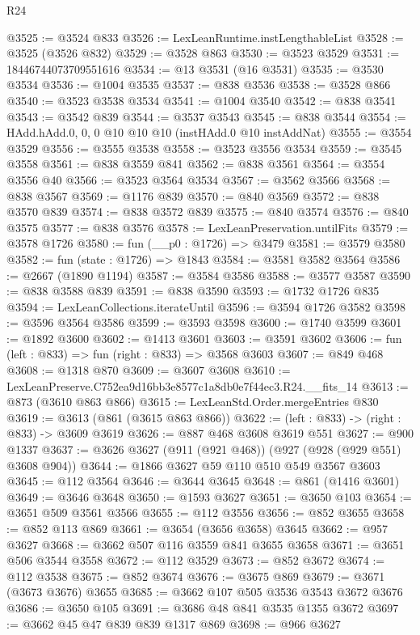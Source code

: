 \begin{lexlean}{R24}
\begin{coremodule}
@3525 := @3524 @833
@3526 := LexLeanRuntime.instLengthableList
@3528 := @3525 (@3526 @832)
@3529 := @3528 @863
@3530 := @3523 @3529
@3531 := 18446744073709551616
@3534 := @13 @3531 (@16 @3531)
@3535 := @3530 @3534
@3536 := @1004 @3535
@3537 := @838 @3536
@3538 := @3528 @866
@3540 := @3523 @3538 @3534
@3541 := @1004 @3540
@3542 := @838 @3541
@3543 := @3542 @839
@3544 := @3537 @3543
@3545 := @838 @3544
@3554 := HAdd.hAdd.{0, 0, 0} @10 @10 @10 (instHAdd.{0} @10 instAddNat)
@3555 := @3554 @3529
@3556 := @3555 @3538
@3558 := @3523 @3556 @3534
@3559 := @3545 @3558
@3561 := @838 @3559 @841
@3562 := @838 @3561
@3564 := @3554 @3556 @40
@3566 := @3523 @3564 @3534
@3567 := @3562 @3566
@3568 := @838 @3567
@3569 := @1176 @839
@3570 := @840 @3569
@3572 := @838 @3570 @839
@3574 := @838 @3572 @839
@3575 := @840 @3574
@3576 := @840 @3575
@3577 := @838 @3576
@3578 := LexLeanPreservation.untilFits
@3579 := @3578 @1726
@3580 := fun (__p0 : @1726) => @3479
@3581 := @3579 @3580
@3582 := fun (state : @1726) => @1843
@3584 := @3581 @3582 @3564
@3586 := @2667 (@1890 @1194)
@3587 := @3584 @3586
@3588 := @3577 @3587
@3590 := @838 @3588 @839
@3591 := @838 @3590
@3593 := @1732 @1726 @835
@3594 := LexLeanCollections.iterateUntil
@3596 := @3594 @1726 @3582
@3598 := @3596 @3564 @3586
@3599 := @3593 @3598
@3600 := @1740 @3599
@3601 := @1892 @3600
@3602 := @1413 @3601
@3603 := @3591 @3602
@3606 := fun (left : @833) => fun (right : @833) => @3568 @3603
@3607 := @849 @468
@3608 := @1318 @870
@3609 := @3607 @3608
@3610 := LexLeanPreserve.C752ea9d16bb3e8577c1a8db0e7f44ec3.R24.__fits_14
@3613 := @873 (@3610 @863 @866)
@3615 := LexLeanStd.Order.mergeEntries @830
@3619 := @3613 (@861 (@3615 @863 @866))
@3622 := (left : @833) -> (right : @833) -> @3609 @3619
@3626 := @887 @468 @3608 @3619 @551
@3627 := @900 @1337
@3637 := @3626 @3627 (@911 (@921 @468)) (@927 (@928 (@929 @551) @3608 @904))
@3644 := @1866 @3627 @59 @110 @510 @549 @3567 @3603
@3645 := @112 @3564
@3646 := @3644 @3645
@3648 := @861 (@1416 @3601)
@3649 := @3646 @3648
@3650 := @1593 @3627
@3651 := @3650 @103
@3654 := @3651 @509 @3561 @3566
@3655 := @112 @3556
@3656 := @852 @3655
@3658 := @852 @113 @869
@3661 := @3654 (@3656 @3658) @3645
@3662 := @957 @3627
@3668 := @3662 @507 @116 @3559 @841 @3655 @3658
@3671 := @3651 @506 @3544 @3558
@3672 := @112 @3529
@3673 := @852 @3672
@3674 := @112 @3538
@3675 := @852 @3674
@3676 := @3675 @869
@3679 := @3671 (@3673 @3676) @3655
@3685 := @3662 @107 @505 @3536 @3543 @3672 @3676
@3686 := @3650 @105
@3691 := @3686 @48 @841 @3535 @1355 @3672
@3697 := @3662 @45 @47 @839 @839 @1317 @869
@3698 := @966 @3627

\end{coremodule}
\end{lexlean}
